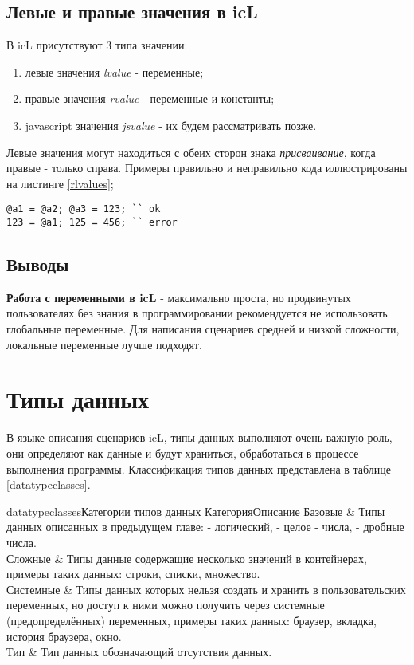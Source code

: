 \documentclass[a4paper, 14pt]{extarticle}
\newenvironment{icEnum}
	{ \begin{enumerate}[noitemsep,nolistsep] }
	{ \end{enumerate} }
\begin{document}
\subsection{Левые и правые значения в icL}

В icL присутствуют 3 типа значении:

\begin{icEnum}
\item
	левые значения {\it lvalue} - переменные;
\item
	правые значения {\it rvalue} - переменные и константы;
\item
	javascript значения {\it jsvalue} - их будем рассматривать позже.
\end{icEnum}

Левые значения могут находиться с обеих сторон знака {\it присваивание}, когда правые - только справа. Примеры правильно и неправильно кода иллюстрированы на листинге \ref{rlvalues};

\begin{lstlisting}[caption=Левые и правые значения, label=rlvalues]
@a1 = @a2; @a3 = 123; `` ok
123 = @a1; 125 = 456; `` error
\end{lstlisting}

\subsection{Выводы}

{\bf Работа с переменными в icL} - максимально проста, но продвинутых пользователях без знания в программировании рекомендуется не использовать глобальные переменные. Для написания сценариев средней и низкой сложности, локальные переменные лучше подходят.

\section{Типы данных}

В языке описания сценариев icL, типы данных выполняют очень важную роль, они определяют как данные и будут храниться, обработаться в процессе выполнения программы. Классификация типов данных представлена в таблице \ref{datatypeclasses}.

\stabletwo{3.5cm}{13.6cm}
{datatypeclasses}{Категории типов данных}
{Категория}{Описание}
{
	Базовые & Типы данных описанных в предыдущем главе: \bool - логический, \integer - целое - числа, \double - дробные числа. \\ \hline
	Сложные & Типы данные содержащие несколько значений в контейнерах, примеры таких данных: строки, списки, множество. \\ \hline
	Системные & Типы данных которых нельзя создать и хранить в пользовательских переменных, но доступ к ними можно получить через системные (предопределённых) переменных, примеры таких данных: браузер, вкладка, история браузера, окно. \\ \hline
	Тип \void & Тип данных обозначающий отсутствия данных.
}
\end{document}

